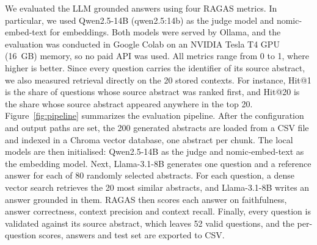 \documentclass[bdcc,article,submit,pdftex,moreauthors]{Definitions/mdpi}
\begin{document}
We evaluated the LLM grounded answers using four RAGAS metrics. In particular, we used Qwen2.5-14B (qwen2.5:14b) as the judge model and nomic-embed-text for embeddings. Both models were served by Ollama, and the evaluation was conducted in Google Colab on an NVIDIA Tesla T4 GPU (16~GB) memory, so no paid API was used. All metrics range from 0 to 1, where higher is better. Since every question carries the identifier of its source abstract, we also measured retrieval directly on the 20 stored contexts. For instance, Hit@1 is the share of questions whose source abstract was ranked first, and Hit@20 is the share whose source abstract appeared anywhere in the top 20.
Figure~\ref{fig:pipeline} summarizes the evaluation pipeline. After the configuration and output paths are set, the 200 generated abstracts are loaded from a CSV file and indexed in a Chroma vector database, one abstract per chunk. The local models are then initialised: Qwen2.5-14B as the judge and nomic-embed-text as the embedding model. Next, Llama-3.1-8B generates one question and a reference answer for each of 80 randomly selected abstracts. For each question, a dense vector search retrieves the 20 most similar abstracts, and Llama-3.1-8B writes an answer grounded in them. RAGAS then scores each answer on faithfulness, answer correctness, context precision and context recall. Finally, every question is validated against its source abstract, which leaves 52 valid questions, and the per-question scores, answers and test set are exported to CSV.
\end{document}
